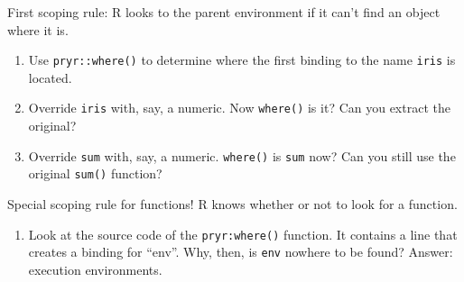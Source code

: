 \documentclass[]{article}
\providecommand{\tightlist}{%
  \setlength{\itemsep}{0pt}\setlength{\parskip}{0pt}}
\begin{document}
First scoping rule: R looks to the parent environment if it can't find
an object where it is.

\begin{enumerate}
\def\labelenumi{\arabic{enumi}.}
\setcounter{enumi}{4}
\item
  Use \texttt{pryr::where()} to determine where the first binding to the
  name \texttt{iris} is located.
\item
  Override \texttt{iris} with, say, a numeric. Now \texttt{where()} is
  it? Can you extract the original?
\item
  Override \texttt{sum} with, say, a numeric. \texttt{where()} is
  \texttt{sum} now? Can you still use the original \texttt{sum()}
  function?
\end{enumerate}

Special scoping rule for functions! R knows whether or not to look for a
function.

\begin{enumerate}
\def\labelenumi{\arabic{enumi}.}
\setcounter{enumi}{7}
\tightlist
\item
  Look at the source code of the \texttt{pryr:where()} function. It
  contains a line that creates a binding for ``env''. Why, then, is
  \texttt{env} nowhere to be found? Answer: execution environments.
\end{enumerate}
\end{document}
